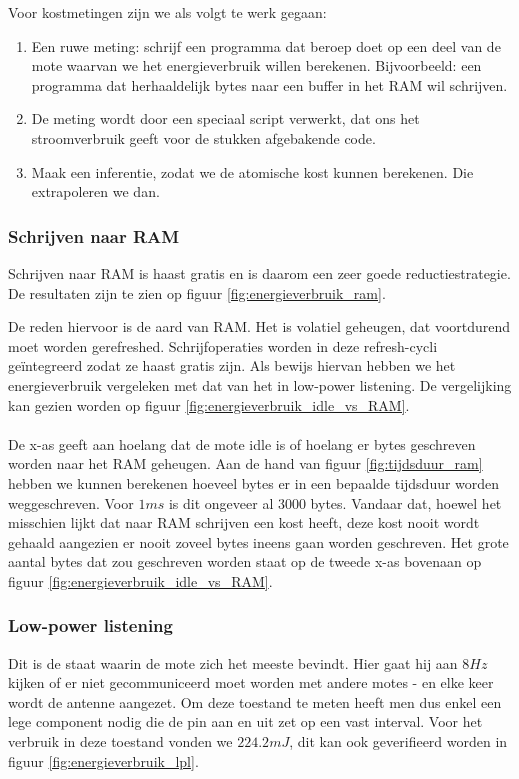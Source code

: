 \documentclass[11pt]{article}
\begin{document}
Voor kostmetingen zijn we als volgt te werk gegaan:

\begin{enumerate}
\item Een ruwe meting: schrijf een programma dat beroep doet op een deel
van de mote waarvan we het energieverbruik willen berekenen. Bijvoorbeeld: een
programma dat herhaaldelijk bytes naar een buffer in het RAM wil schrijven. 
\item De meting wordt door een speciaal script verwerkt, dat ons het stroomverbruik geeft voor de stukken afgebakende code.
\item Maak een inferentie, zodat we de atomische kost kunnen berekenen. Die extrapoleren we dan.
\end{enumerate}

\subsubsection{Schrijven naar RAM}

Schrijven naar RAM is haast gratis en is daarom een zeer goede
reductiestrategie. De resultaten zijn te zien op figuur \ref{fig:energieverbruik_ram}.

De reden hiervoor is de aard van RAM. Het is volatiel geheugen, dat voortdurend
moet worden gerefreshed. Schrijfoperaties worden in deze refresh-cycli
ge\"integreerd zodat ze haast gratis zijn. Als bewijs hiervan hebben we het energieverbruik vergeleken met dat van het in low-power listening. 
De vergelijking kan gezien worden op figuur \ref{fig:energieverbruik_idle_vs_RAM}.\\
\\
De x-as geeft aan hoelang dat de mote idle is of hoelang er bytes geschreven worden naar het RAM geheugen. Aan de hand van figuur \ref{fig:tijdsduur_ram} hebben we kunnen berekenen hoeveel bytes er in een bepaalde tijdsduur worden weggeschreven. Voor $1ms$ is dit ongeveer al 3000 bytes. Vandaar dat, hoewel het misschien lijkt dat naar RAM schrijven een kost heeft, deze kost nooit wordt gehaald aangezien er nooit zoveel bytes ineens gaan worden geschreven. Het grote aantal bytes dat zou geschreven worden staat op de tweede x-as bovenaan op figuur \ref{fig:energieverbruik_idle_vs_RAM}. 
\subsubsection{Low-power listening}
Dit is de staat waarin de mote zich het meeste bevindt. Hier gaat hij aan $8Hz$
kijken of er niet gecommuniceerd moet worden met andere motes - en elke keer
wordt de antenne aangezet. Om deze toestand te meten heeft men dus enkel een
lege component nodig die de pin aan en uit zet op een vast interval. Voor het
verbruik in deze toestand vonden we $224.2mJ$, dit kan ook geverifieerd worden
in figuur \ref{fig:energieverbruik_lpl}.
\end{document}
